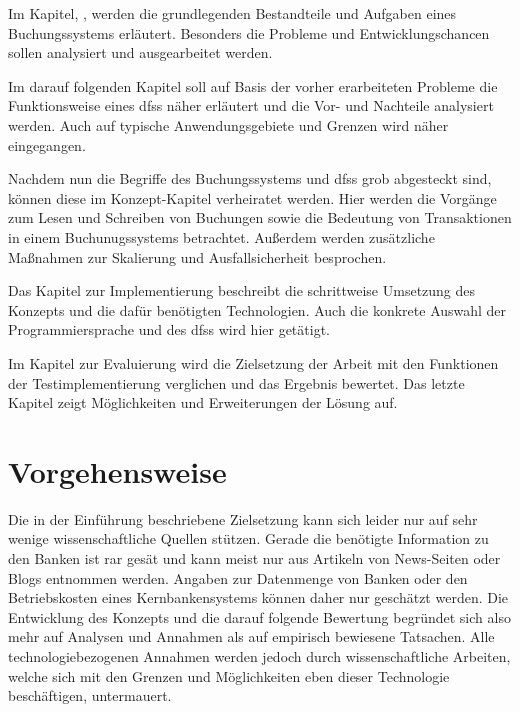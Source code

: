 \documentclass[12pt,oneside,a4paper,parskip]{scrbook}
\begin{document}
Im Kapitel, , werden die grundlegenden Bestandteile und Aufgaben eines Buchungssystems erläutert. Besonders die Probleme und Entwicklungschancen sollen analysiert und ausgearbeitet werden.

Im darauf folgenden Kapitel soll auf Basis der vorher erarbeiteten Probleme die Funktionsweise eines \acp{dfs} näher erläutert und die Vor- und Nachteile analysiert werden. Auch auf typische Anwendungsgebiete und Grenzen wird näher eingegangen.

Nachdem nun die Begriffe des Buchungssystems und \acp{dfs} grob abgesteckt sind, können diese im Konzept-Kapitel verheiratet werden. Hier werden die Vorgänge zum Lesen und Schreiben von Buchungen sowie die Bedeutung von Transaktionen in einem Buchunugssystems betrachtet. Außerdem werden zusätzliche Maßnahmen zur Skalierung und Ausfallsicherheit besprochen.

Das Kapitel zur Implementierung beschreibt die schrittweise Umsetzung des Konzepts und die dafür benötigten Technologien. Auch die konkrete Auswahl der Programmiersprache und des \acp{dfs} wird hier getätigt.

Im Kapitel zur Evaluierung wird die Zielsetzung der Arbeit mit den Funktionen der Testimplementierung verglichen und das Ergebnis bewertet. Das letzte Kapitel zeigt Möglichkeiten und Erweiterungen der Lösung auf.


\chapter{Vorgehensweise}
Die in der Einführung beschriebene Zielsetzung kann sich leider nur auf sehr wenige wissenschaftliche Quellen stützen. Gerade die benötigte Information zu den Banken ist rar gesät und kann meist nur aus Artikeln von News-Seiten oder Blogs entnommen werden. Angaben zur Datenmenge von Banken oder den Betriebskosten eines Kernbankensystems können daher nur geschätzt werden. Die Entwicklung des Konzepts und die darauf folgende Bewertung begründet sich also mehr auf Analysen und Annahmen als auf empirisch bewiesene Tatsachen. Alle technologiebezogenen Annahmen werden jedoch durch wissenschaftliche Arbeiten, welche sich mit den Grenzen und Möglichkeiten eben dieser Technologie beschäftigen, untermauert.
\end{document}

